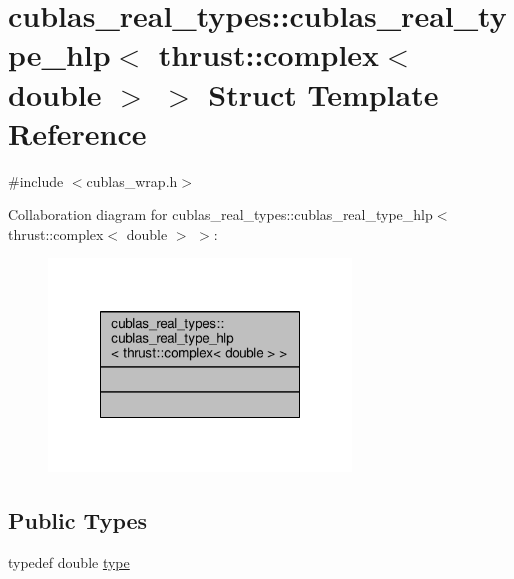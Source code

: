 \hypertarget{structcublas__real__types_1_1cublas__real__type__hlp_3_01thrust_1_1complex_3_01double_01_4_01_4}{\section{cublas\-\_\-real\-\_\-types\-:\-:cublas\-\_\-real\-\_\-type\-\_\-hlp$<$ thrust\-:\-:complex$<$ double $>$ $>$ Struct Template Reference}
\label{structcublas__real__types_1_1cublas__real__type__hlp_3_01thrust_1_1complex_3_01double_01_4_01_4}
}


{\ttfamily \#include $<$cublas\-\_\-wrap.\-h$>$}



Collaboration diagram for cublas\-\_\-real\-\_\-types\-:\-:cublas\-\_\-real\-\_\-type\-\_\-hlp$<$ thrust\-:\-:complex$<$ double $>$ $>$\-:\nopagebreak
\begin{figure}[H]
\begin{center}
\leavevmode
\includegraphics[width=228pt]{structcublas__real__types_1_1cublas__real__type__hlp_3_01thrust_1_1complex_3_01double_01_4_01_4__coll__graph}
\end{center}
\end{figure}
\subsection*{Public Types}
\begin{DoxyCompactItemize}
\item 
typedef double \hyperlink{structcublas__real__types_1_1cublas__real__type__hlp_3_01thrust_1_1complex_3_01double_01_4_01_4_a3c16a6086c808ba1aab003acb23ad9fb}{type}
\end{DoxyCompactItemize}


